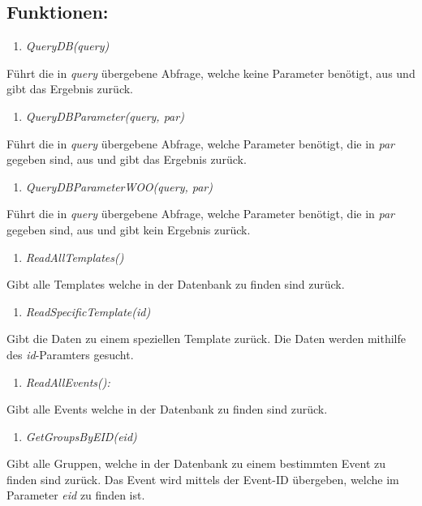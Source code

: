 \documentclass[12pt,parskip=full, pagea4]{scrreprt}
\begin{document}
			\subsection{Funktionen:}
			\begin{enumerate}[resume]
				\item \textit{QueryDB(query)}
			\end{enumerate}
			\leftskip=1.5cm	Führt die in \textit{query} \"ubergebene Abfrage, welche keine Parameter benötigt, aus und gibt das Ergebnis zur\"uck.
			\begin{enumerate}[resume]
				\item \textit{QueryDBParameter(query, par)}
			\end{enumerate}
			\leftskip=1.5cm	Führt die in \textit{query} \"ubergebene Abfrage, welche Parameter benötigt, die in \textit{par} gegeben sind, aus und gibt das Ergebnis zur\"uck.
			\begin{enumerate}[resume]
				\item \textit{QueryDBParameterWOO(query, par)}
			\end{enumerate}
			\leftskip=1.5cm	Führt die in \textit{query} \"ubergebene Abfrage, welche Parameter benötigt, die in \textit{par} gegeben sind, aus und gibt kein Ergebnis zur\"uck.
			\begin{enumerate}[resume]
				\item \textit{ReadAllTemplates()}
			\end{enumerate}
			\leftskip=1.5cm	Gibt alle Templates welche in der Datenbank zu finden sind zur\"uck.
			\begin{enumerate}[resume]
				\item \textit{ReadSpecificTemplate(id)}
			\end{enumerate}
			\leftskip=1.5cm	Gibt die Daten zu einem speziellen Template zurück. Die Daten werden mithilfe des \textit{id}-Paramters gesucht.
			\begin{enumerate}[resume]
				\item \textit{ReadAllEvents():}
			\end{enumerate}
			\leftskip=1.5cm	Gibt alle Events welche in der Datenbank zu finden sind zur\"uck.
			\begin{enumerate}[resume]
				\item \textit{GetGroupsByEID(eid)}
			\end{enumerate}
			\leftskip=1.5cm	Gibt alle Gruppen, welche in der Datenbank zu einem bestimmten Event zu finden sind zur\"uck. Das Event wird mittels der Event-ID \"ubergeben, welche im Parameter \textit{eid} zu finden ist.
\end{document}
